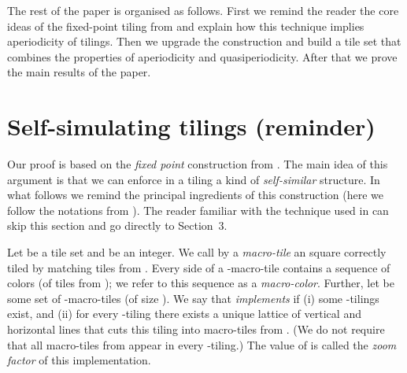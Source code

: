 \documentclass[runningheads]{llncs}
\begin{document}
The rest of the paper is organised as follows. First we remind the reader the core ideas of the fixed-point tiling from \cite{drs} and explain how this technique implies aperiodicity of tilings. Then we upgrade the construction and build a tile set that combines the properties of aperiodicity and quasiperiodicity. After that we prove the main results of the paper.
 


\section{Self-simulating tilings (reminder)}
Our proof is based on the \emph{fixed point} construction from \cite{drs}. The main idea of this argument is that we can enforce in a tiling a kind of   \emph{self-similar} structure.  In what follows we remind the principal ingredients of this construction (here we follow the notations from \cite{drs}).
The reader familiar with the technique used in  \cite{drs} can skip this section and go directly to Section~3.


 Let  be a tile set and  be an integer. We call by a \emph{macro-tile} an  square correctly tiled by matching tiles from . Every side of a -macro-tile contains  a sequence of  colors (of tiles from ); we refer to this sequence as a \emph{macro-color}.
Further, let  be some set of -macro-tiles (of size ). We say that  \emph{implements}  if (i) some -tilings exist, and (ii) for every -tiling there exists a unique lattice of vertical and horizontal lines that cuts this tiling into  macro-tiles from . (We do not require that all macro-tiles from  appear in every -tiling.) The value of  is called the  \emph{zoom factor} of this implementation.
  
\end{document}

